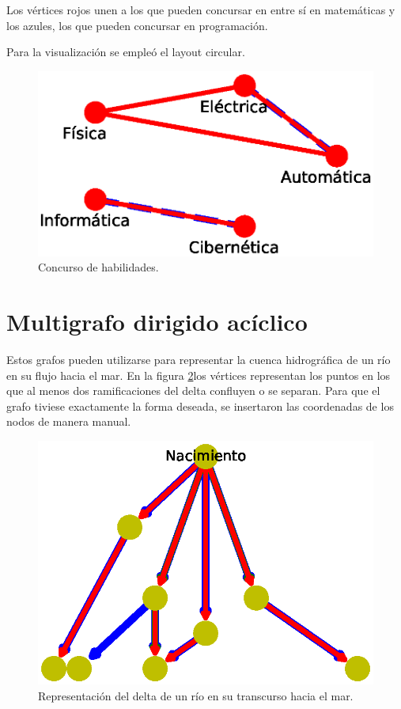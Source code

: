 \documentclass{article}
\begin{document}
Los vértices rojos unen a los que pueden concursar en entre sí en matemáticas y los azules, los que pueden concursar en programación.

Para la visualización se empleó el layout circular.

\begin{figure}
  \includegraphics[width=.8\columnwidth]{fig9.eps}
  \caption{Concurso de habilidades.}
  \label{Figura 9}
\end{figure}




\section{Multigrafo dirigido acíclico}

Estos grafos pueden utilizarse para representar la cuenca hidrográfica de un río en su flujo hacia el mar. En la figura \ref{Figura 10}los vértices representan los puntos en los que al menos dos ramificaciones del delta confluyen o se separan. Para que el grafo tiviese exactamente la forma deseada, se insertaron las coordenadas de los nodos de manera manual.

\begin{figure}
  \includegraphics[width=.8\columnwidth]{fig10.eps}
  \caption{Representación del delta de un río en su transcurso hacia el mar.}
  \label{Figura 10}
\end{figure}
\end{document}
